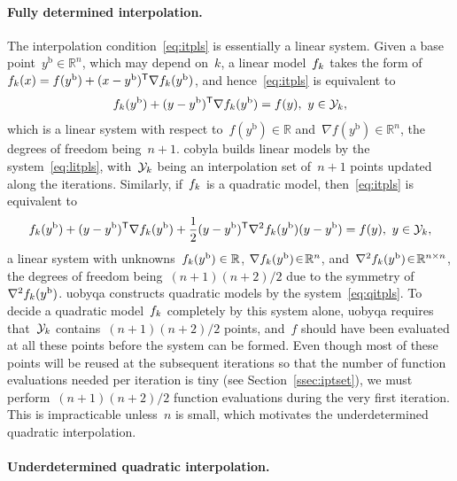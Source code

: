 \documentclass[
    smallextended,  %
    draft,          %
    final,          %
]{svjour3}
\newcommand{\R}{\mathbb{R}}
\newcommand{\T}{\mathsf{T}}
\newcommand{\base}{{\text{b}}}
\newcommand{\objm}[1][k]{\obj\ifthenelse{\equal{#1}{}}{}{_{#1}}}
\newcommand{\obj}{f}
\newcommand{\xpt}[1][k]{\mathcal{Y}\ifthenelse{\equal{#1}{}}{}{_{#1}}}
\begin{document}
\paragraph{\textnormal{\textbf{Fully determined interpolation.}}}

The interpolation condition~\eqref{eq:itpls} is essentially a linear system.
Given a base point~$y^{\base}\in \R^n$, which may depend on~$k$, a linear model~$\objm$ takes the
form of~$\objm(x) = \obj(y^{\base}) + (x - y^{\base})^{\T} \nabla \objm(y^{\base})$, and
hence~\eqref{eq:itpls} is equivalent to
\begin{equation}
    \label{eq:litpls}
    \objm(y^{\base}) + (y -y^{\base})^{\T} \nabla \objm(y^{\base}) = \obj(y), ~ y \in \xpt,
\end{equation}
which is a linear system with respect to~$\obj(y^\base) \in \R$ and~$\nabla \obj(y^\base) \in \R^n$, the degrees of freedom being~$n+1$.
\Gls{cobyla} builds linear models by the system~\eqref{eq:litpls}, with~$\xpt$ being an interpolation
set of~$n+1$ points updated along the iterations.
Similarly, if~$\objm$ is a quadratic model, then~\eqref{eq:itpls} is equivalent to
\begin{equation}
    \label{eq:qitpls}
    \objm(y^{\base}) + (y -y^{\base})^{\T} \nabla \objm(y^{\base})
    + \frac{1}{2}(y-y^{\base})^{\T} \nabla^2 \objm(y^{\base}) (y-y^{\base}) = \obj(y), ~ y \in \xpt,
\end{equation}
a linear system with unknowns~$\objm(y^\base) \in \R$, $\nabla \objm(y^\base) \!\in\! \R^n$,
and~$\nabla^2 \objm(y^{\base})\!\in\!\R^{n \times n}$, the degrees of freedom being~$(n + 1)(n + 2) / 2$ due to the symmetry of~$\nabla^2 \objm(y^\base)$.
\gls{uobyqa} constructs quadratic models by the system~\eqref{eq:qitpls}.
To decide a quadratic model~$\objm$ completely by this system alone,
\gls{uobyqa} requires that~$\xpt$ contains~$(n+1)(n+2)/2$ points, and~$f$ should have been evaluated
at all these points before the system can be formed.
Even though most of these points will be reused at the subsequent iterations so that the number of
function evaluations needed per iteration is tiny (see Section~\ref{ssec:iptset}), we must perform~$(n + 1)(n + 2) / 2$ function evaluations during the very first iteration.
This is impracticable unless~$n$ is small, which motivates the underdetermined quadratic interpolation.

\paragraph{\textnormal{\textbf{Underdetermined quadratic interpolation.}}}
\end{document}
